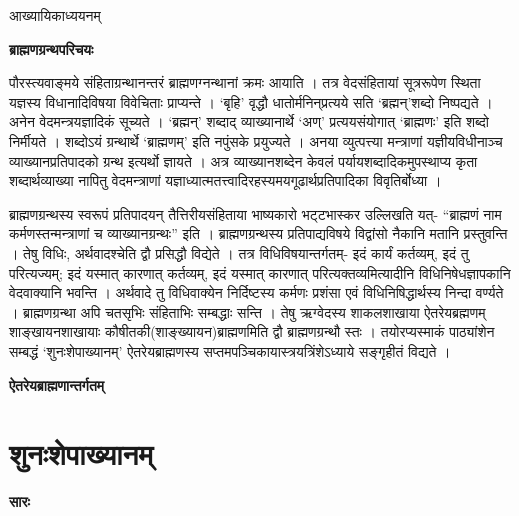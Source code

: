 \documentclass[11pt, a5paper]{article}
\begin{document}
आख्यायिकाध्ययनम्

\textbf{ब्राह्मणग्रन्थपरिचयः}

पौरस्त्यवाङ्‌मये संहिताग्रन्थानन्तरं ब्राह्मणग्नन्थानां क्रमः आयाति । तत्र वेदसंहितायां सूत्ररूपेण स्थिता यज्ञस्य विधानादिविषया विवेचिताः प्राप्यन्ते । ‘बृहि’ वृद्धौ धातोर्मनिन्‌प्रत्यये सति ‘ब्रह्मन्’शब्दो निष्पद्यते । अनेन वेदमन्त्रयज्ञादिकं सूच्यते । ‘ब्रह्मन्’ शब्दाद् व्याख्यानार्थे ‘अण्’ प्रत्ययसंयोगात् ‘ब्राह्मणः’ इति शब्दो निर्मीयते । शब्दोऽयं ग्रन्थार्थे ‘ब्राह्मणम्’ इति नपुंसके प्रयुज्यते । अनया व्युत्पत्त्या मन्त्राणां यज्ञीयविधीनाञ्च व्याख्यानप्रतिपादको ग्रन्थ इत्यर्थो ज्ञायते । अत्र व्याख्यानशब्देन केवलं पर्यायशब्दादिकमुपस्थाप्य कृता शब्दार्थव्याख्या नापितु वेदमन्त्राणां यज्ञाध्यात्मतत्त्वादिरहस्यमयगूढार्थप्रतिपादिका विवृतिर्बोध्या ।

ब्राह्मणग्रन्थस्य स्वरूपं प्रतिपादयन् तैत्तिरीयसंहिताया भाष्यकारो भट्‌टभास्कर उल्लिखति यत्- “ब्राह्मणं नाम कर्मणस्तन्मन्त्राणां च व्याख्यानग्रन्थः” इति । ब्राह्मणग्रन्थस्य प्रतिपाद्यविषये विद्वांसो नैकानि मतानि प्रस्तुवन्ति । तेषु विधिः, अर्थवादश्चेति द्वौ प्रसिद्धौ विद्येते । तत्र विधिविषयान्तर्गतम्- इदं  कार्यं कर्तव्यम्, इदं तु परित्यज्यम्; इदं यस्मात् कारणात् कर्तव्यम्, इदं यस्मात् कारणात् परित्यक्तव्यमित्यादीनि विधिनिषेधज्ञापकानि  वेदवाक्यानि भवन्ति । अर्थवादे तु विधिवाक्येन निर्दिष्टस्य कर्मणः प्रशंसा एवं विधिनिषिद्धार्थस्य निन्दा वर्ण्यते । ब्राह्मणग्रन्था अपि चतसृभिः संहिताभिः सम्बद्धाः सन्ति । तेषु ऋग्वेदस्य शाकलशाखाया ऐतरेयब्रह्मणम् शाङ्खायनशाखायाः कौषीतकी(शाङ्‌ख्यायन)ब्राह्मणमिति द्वौ ब्राह्मणग्रन्थौ स्तः । तयोरप्यस्माकं पाठ्यांशेन सम्बद्धं ‘शुनःशेपाख्यानम्’ ऐतरेयब्राह्मणस्य सप्तमपञ्चिकायास्त्रयत्रिंशेऽध्याये सङ्‌गृहीतं विद्यते ।

\textbf{ऐतरेयब्राह्मणान्तर्गतम्}

\section{\textbf{शुनःशेपाख्यानम्}}

\textbf{सारः}
\end{document}
